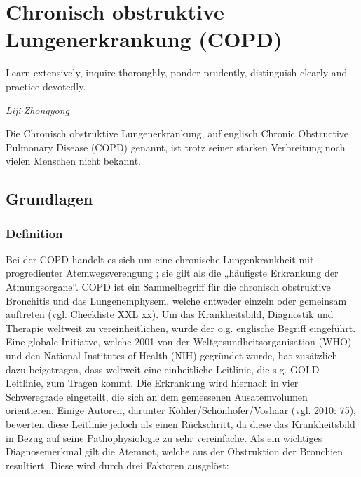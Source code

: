 \ifpdf
    \graphicspath{{2_chronisch_obstruktive_lungenerkrankung/figures/PNG/}{2_chronisch_obstruktive_lungenerkrankung/figures/PDF/}{2_chronisch_obstruktive_lungenerkrankung/figures/}}
\else
    \graphicspath{{2_chronisch_obstruktive_lungenerkrankung/figures/EPS/}{2_chronisch_obstruktive_lungenerkrankung/figures/}}
\fi

\chapter{Chronisch obstruktive Lungenerkrankung (COPD)}
\label{chapter:soa}
\setlength{\epigraphwidth}{6.0cm}
\epigraph{Learn extensively, inquire thoroughly, ponder prudently, distinguish clearly and practice devotedly.}{\emph{Liji$\cdot$Zhongyong}}



Die Chronisch obstruktive Lungenerkrankung, auf englisch Chronic Obstructive Pulmonary Disease (COPD) genannt, ist trotz seiner starken Verbreitung noch vielen Menschen nicht bekannt.

\section{Grundlagen} %

\subsection{Definition}
Bei der COPD handelt es sich um eine chronische Lungenkrankheit mit progredienter Atemwegsverengung ; sie gilt als die „häufigste Erkrankung der Atmungsorgane“. COPD ist ein Sammelbegriff für die chronisch obstruktive Bronchitis und das Lungenemphysem, welche entweder einzeln oder gemeinsam auftreten (vgl. Checkliste XXL xx). Um das Krankheitsbild, Diagnostik und Therapie weltweit zu vereinheitlichen, wurde der o.g. englische Begriff eingeführt. Eine globale Initiatve, welche 2001 von der Weltgesundheitsorganisation (WHO) und den National Institutes of Health (NIH) gegründet wurde, hat zusätzlich dazu beigetragen, dass weltweit eine einheitliche Leitlinie, die s.g. GOLD-Leitlinie, zum Tragen kommt. Die Erkrankung wird hiernach in vier Schweregrade eingeteilt, die sich an dem gemessenen Ausatemvolumen orientieren. Einige Autoren, darunter Köhler/Schönhofer/Voshaar (vgl. 2010: 75), bewerten diese Leitlinie jedoch als einen Rückschritt, da diese das Krankheitsbild in Bezug auf seine Pathophysiologie zu sehr vereinfache.
Als ein wichtiges Diagnosemerkmal gilt die Atemnot, welche aus der Obstruktion der Bronchien resultiert. Diese wird durch drei Faktoren ausgelöst: 

